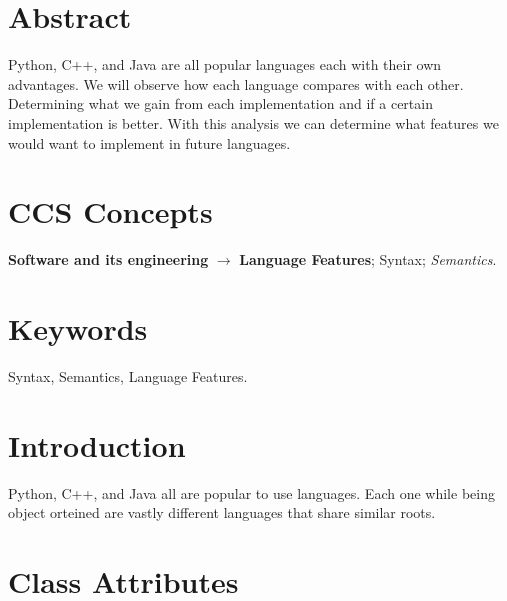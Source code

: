 \documentclass[sigconf, nonacm, authorversion, language=english, 12pt]{acmart}
\begin{document}





\PLtitle


\section*{Abstract}
Python, C++, and Java are all popular languages each with their own advantages. We will observe how each
language compares with each other. Determining what we gain from each implementation and if a certain implementation is
better. With this analysis we can determine what features we would want to implement in future languages.\\

\section*{CCS Concepts}
\textbullet\hspace*{0.5mm} \textbf{Software and its engineering} $\rightarrow$ \textbf{Language Features}; Syntax; \textit{Semantics}.\\
\section*{Keywords}
Syntax, Semantics, Language Features.\\
\section{Introduction}
Python, C++, and Java all are popular to use languages. Each one while being object orteined are vastly different languages that share similar roots.


\section{Class Attributes}
\end{document}
